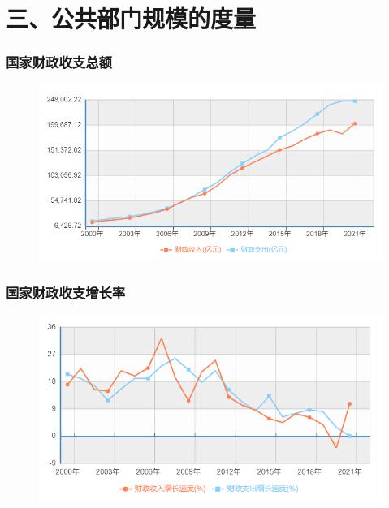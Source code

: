 \documentclass[aspectratio=169, 12pt]{beamer}
\begin{document}
\section{三、公共部门规模的度量}

\begin{frame}[plain]
    \frametitle{国家财政收支总额}
    \begin{figure}
        \centering
        \includegraphics[width=1.0\textwidth]{./resources/figure/finance.png}
    \end{figure}
\end{frame}

\begin{frame}[plain]
    \frametitle{国家财政收支增长率}
    \begin{figure}
        \centering
        \includegraphics[width=1.0\textwidth]{./resources/figure/finrate.png}
    \end{figure}
\end{frame}
\end{document}
